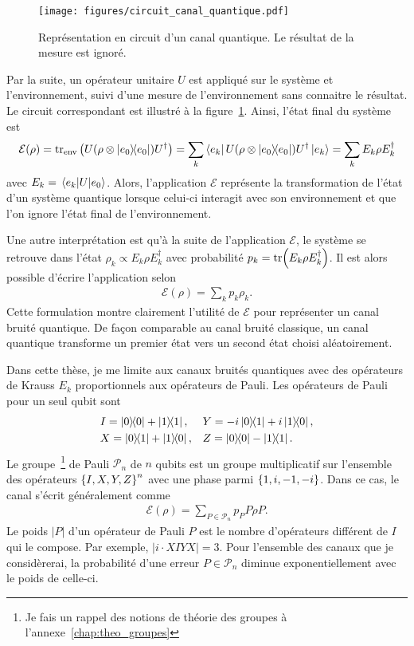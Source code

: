 \begin{figure}
  \begin{center}
    \texttt{[image: figures/circuit\_canal\_quantique.pdf]}
  \end{center}
  \caption[Représentation en circuit d'un canal quantique]{
    Représentation en circuit d'un canal quantique.
    Le résultat de la mesure est ignoré.
  }
  \label{fig:circuit_canal_quantique}
\end{figure}

Par la suite,
un opérateur unitaire $U$ est appliqué sur le système et l'environnement,
suivi d'une mesure de l'environnement sans connaitre le résultat.
Le circuit correspondant est illustré à la figure~\ref{fig:circuit_canal_quantique}.
Ainsi, l'état final du système est
\begin{equation}
  \mathcal{E}(\rho) 
  = \tr_{\text{env}}\qty(U(\rho \otimes \op{e_0})U^\dag)
  = \sum_k \bra{e_k}U(\rho \otimes \op{e_0}) U^\dag \ket{e_k}
  = \sum_k E_k \rho E_k^\dag
\end{equation}
avec $E_k = \mel{e_k}{U}{e_0}$.
Alors,
l'application $\mathcal{E}$ représente la transformation de l'état d'un système quantique
lorsque celui-ci interagit avec son environnement et que l'on ignore l'état final
de l'environnement.

Une autre interprétation est qu'à la suite de l'application $\mathcal E$,
le système se retrouve dans l'état $\rho_k \propto E_k \rho E_k^\dag$
avec probabilité $p_k = \tr(E_k \rho E_k^\dag)$.
Il est alors possible d'écrire l'application selon
\begin{align}
  \mathcal E(\rho) = \sum_k p_k \rho_k.
\end{align}
Cette formulation montre clairement l'utilité de $\mathcal E$ pour
représenter un canal bruité quantique.
De façon comparable au canal bruité classique,
un canal quantique transforme un premier état 
vers un second état choisi aléatoirement.

Dans cette thèse,
je me limite aux canaux bruités quantiques avec des opérateurs 
de Krauss $E_k$ proportionnels aux opérateurs de Pauli.
Les opérateurs de Pauli pour un seul qubit sont 
\begin{align}
  &I = \op{0}{0} + \op{1}{1}, 
  &&Y = -i\op{0}{1} + i\op{1}{0}, \notag \\
  &X = \op{0}{1} + \op{1}{0}, 
  &&Z = \op{0}{0} - \op{1}{1}.
\end{align}
Le groupe~\footnote{Je fais un rappel des notions de théorie des groupes à l'annexe~\ref{chap:theo_groupes}}
de Pauli $\mathcal P_n$ de $n$ qubits est un groupe multiplicatif sur 
l'ensemble des opérateurs $\qty{I, X, Y, Z}^n$ avec une phase parmi $\qty{1, i, -1, -i}$.
Dans ce cas,
le canal s'écrit généralement comme
\begin{align}
  \mathcal E(\rho) = \sum_{P \in \mathcal P_n} p_P P\rho P.
\end{align}
Le poids $|P|$ d'un opérateur de Pauli $P$ est le nombre d'opérateurs différent de $I$ qui le compose.
Par exemple, $|i\cdot XIYX| = 3$.
Pour l'ensemble des canaux que je considèrerai,
la probabilité d'une erreur $P \in \mathcal P_n$ diminue exponentiellement avec le poids 
de celle-ci.

